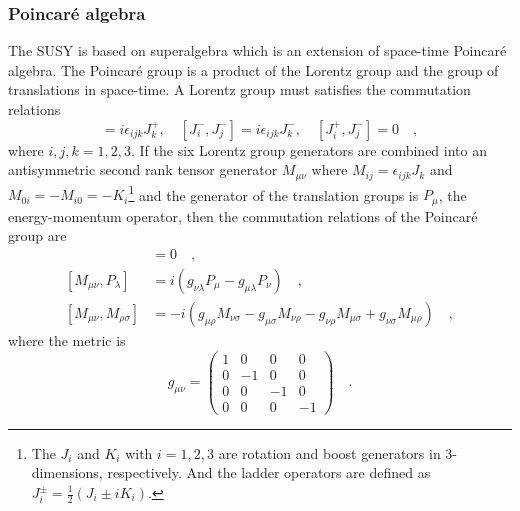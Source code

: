 \subsubsection{Poincar\'{e} algebra}
\label{subsubsec:susy_poincare}
The SUSY is based on superalgebra which is an extension of space-time Poincar\'{e} algebra.
The Poincar\'{e} group is a product of the Lorentz group and the group of translations in space-time.
A Lorentz group must satisfies the commutation relations
%
\begin{equation}
    [J^{+}_{i}, J^{+}_{j}] = i \epsilon_{ijk} J^{+}_{k}, \quad 
    [J^{-}_{i}, J^{-}_{j}] = i \epsilon_{ijk} J^{-}_{k}, \quad 
    [J^{+}_{i}, J^{-}_{j}] = 0 \quad ,
    \label{eq:susy_Lorentz_commutation_relations}
\end{equation}
%
where $i, j, k = 1, 2, 3$.
If the six Lorentz group generators are combined into an antisymmetric second rank tensor generator $M_{\mu\nu}$ where $M_{ij} = \epsilon_{ijk}J_{k}$ and $M_{0i} = -M_{i0} = -K_{i}$\footnote{The $J_{i}$ and $K_{i}$ with $i=1,2,3$ are rotation and boost generators in 3-dimensions, respectively. And the ladder operators are defined as $J_{i}^{\pm} = \frac{1}{2} (J_{i} \pm i K_{i})$.} and the generator of the translation groups is $P_{\mu}$, the energy-momentum operator, then the commutation relations of the Poincar\'{e} group are
%
\begin{align}
    [P_{\mu}, P_{\nu}] &= 0 \quad ,\\
    [M_{\mu \nu}, P_{\lambda}] &= i (g_{\nu \lambda} P_{\mu} - g_{\mu \lambda} P_{\nu}) \quad ,\\
    [M_{\mu \nu}, M_{\rho \sigma}] &= -i (g_{\mu \rho} M_{\nu \sigma} - g_{\mu \sigma} M_{\nu \rho} - g_{\nu \rho} M_{\mu \sigma} + g_{\nu \sigma} M_{\mu \rho}) \quad ,
    \label{eq:susy_Poincare_commutation_relations}
\end{align}
%
where the metric is
%
\begin{equation}
    g_{\mu \nu} =
    \left(
        \begin{array}{cccc}
            1 & 0  & 0  & 0\\
            0 & -1 & 0  & 0\\
            0 & 0  & -1 & 0\\
            0 & 0  & 0  & -1   
        \end{array}
    \right) \quad.
    \label{eq:susy_metric}
\end{equation}


